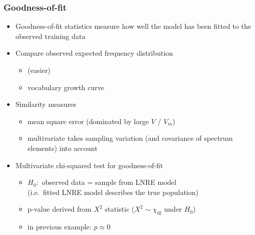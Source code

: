 \documentclass[t]{beamer} %
\begin{document}
\begin{frame}
  \frametitle{Goodness-of-fit}

  \begin{itemize}
  \item Goodness-of-fit statistics measure how well the model has been fitted to the observed training data
  \item Compare observed \vs expected frequency distribution
    \begin{itemize}
    \item {} (\so easier)
    \item vocabulary growth curve
    \end{itemize}
  \item<2-> Similarity measures
    \begin{itemize}
    \item mean square error (\so dominated by large $V$ / $V_m$)
    \item multivariate  takes sampling variation (and covariance of spectrum elements) into account
    \end{itemize}
  \item<3-> Multivariate chi-squared test for goodness-of-fit
    \begin{itemize}
    \item $H_0:$ observed data = sample from LNRE model\\
      (i.e.\ fitted LNRE model describes the true population)
    \item p-value derived from $X^2$ statistic ($X^2 \sim \chi_{\text{df}}$ under $H_0$)
    \item in previous example: $p\approx 0$ $\quad$\sadsmilie
    \end{itemize}
  \end{itemize}
\end{frame}
\end{document}
